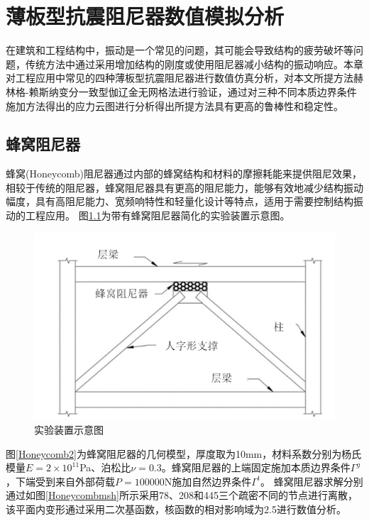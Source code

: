 \chapter{薄板型抗震阻尼器数值模拟分析}
在建筑和工程结构中，振动是一个常见的问题，其可能会导致结构的疲劳破坏等问题，传统方法中通过采用增加结构的刚度或使用阻尼器减小结构的振动响应。本章对工程应用中常见的四种薄板型抗震阻尼器进行数值仿真分析，对本文所提方法赫林格-赖斯纳变分一致型伽辽金无网格法进行验证，通过对三种不同本质边界条件施加方法得出的应力云图进行分析得出所提方法具有更高的鲁棒性和稳定性。
\section{蜂窝阻尼器}
蜂窝(Honeycomb)阻尼器通过内部的蜂窝结构和材料的摩擦耗能来提供阻尼效果，相较于传统的阻尼器，蜂窝阻尼器具有更高的阻尼能力，能够有效地减少结构振动幅度，具有高阻尼能力、宽频响特性和轻量化设计等特点，适用于需要控制结构振动的工程应用。
图\ref{Honeycomb1}为带有蜂窝阻尼器简化的实验装置示意图。
\begin{figure}[H]
    \centering
    \includegraphics[scale=0.6]{figure/DAMPER/Honeycomb/1.png}
    \caption{实验装置示意图\cite{javanmardi2020}}\label{Honeycomb1}
\end{figure}
图\ref{Honeycomb2}为蜂窝阻尼器的几何模型，厚度取为10mm，材料系数分别为杨氏模量$E=2\times 10^{11}$Pa、泊松比$\nu=0.3$。蜂窝阻尼器的上端固定施加本质边界条件$\Gamma^g$，下端受到来自外部荷载$P=100000$N施加自然边界条件$\Gamma^t$。
蜂窝阻尼器求解分别通过如图\ref{Honeycombmsh}所示采用78、208和445三个疏密不同的节点进行离散，该平面内变形通过采用二次基函数，核函数的相对影响域为2.5进行数值分析。
